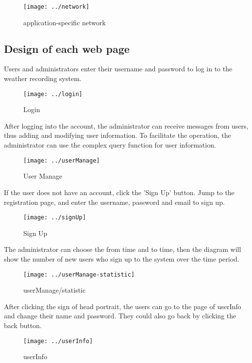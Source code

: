 \documentclass[]{article}
\begin{document}
	\begin{figure}[H]
		\centering
		\texttt{[image: ../network]}
		\caption{application-specific network}
		\label{fig:network}
	\end{figure}
	
	\clearpage
	
	\subsection{Design of each web page}
	
	\noindent Users and administrators enter their username and password to log in to the weather recording system.
	\begin{figure}[H]
		\centering
		\texttt{[image: ../login]}
		\caption{Login}
		\label{fig:login}
	\end{figure}
	
	\noindent After logging into the account, the administrator can receive messages from users, thus adding and modifying user information. To facilitate the operation, the administrator can use the complex query function for user information.
	\begin{figure}[H]
		\centering
		\texttt{[image: ../userManage]}
		\caption{User Manage}
		\label{fig:usermanage}
	\end{figure}
	
	\noindent If the user does not have an account, click the 'Sign Up' button. Jump to the registration page, and enter the username, password and email to sign up.
	\begin{figure}[H]
		\centering
		\texttt{[image: ../signUp]}
		\caption{Sign Up}
		\label{fig:signup}
	\end{figure}
	
	\noindent The administrator can choose the from time and to time, then the diagram will show the number of new users who sign up to the system over the time period.
	\begin{figure}[H]
		\centering
		\texttt{[image: ../userManage-statistic]}
		\caption{userManage/statistic}
		\label{fig:usermanage-statistic}
	\end{figure}
	
	\noindent After clicking the sign of head portrait, the users can go to the page of userInfo and change their name and password. They could also go back by clicking the back button.
	\begin{figure}[H]
		\centering
		\texttt{[image: ../userInfo]}
		\caption{userInfo}
		\label{fig:userinfo}
	\end{figure}
	
\end{document}
